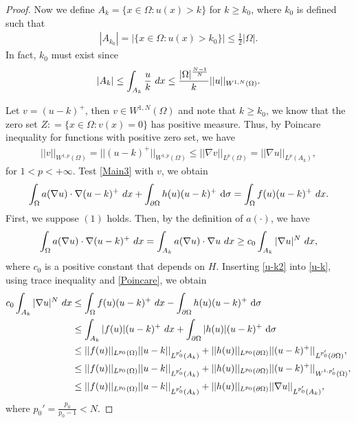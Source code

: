 \documentclass[10pt,a4paper]{amsart}
\numberwithin{equation}{section}
\newcommand{\pa}{\partial}
\newcommand{\dx}{\textup{d}x}
\begin{document}
\begin{proof}
    Now we  define $A_k = \{x \in \Omega: u(x) > k\}$ for $k \geq k_0$, where $k_0$ is defined such that
    \begin{align*}
        |A_{k_0}| = |\{x \in \Omega: u(x) > k_0\}| \leq \frac{1}{2} |\Omega|.
    \end{align*}
    In fact, $k_0$ must exist since
    \begin{align*}
        |A_k| \leq \int_{A_k} \frac{u}{k} \ \dx \leq \frac{|\Omega|^{\frac{N-1}{N}}}{k} ||u||_{W^{1,N}(\Omega)}.
    \end{align*}
    
    Let $v = (u - k)^+$, then $v \in W^{1,N}(\Omega)$ and note that  $k\geq k_0$, we know that the zero set $Z : = \{x \in \Omega: v(x)=0\}$ has positive measure. Thus, by Poincare inequality for functions with positive zero set, we have
    \begin{align}\label{Poincare}
        ||v||_{W^{1,p}(\Omega)} =  ||(u-k)^+||_{W^{1,p}(\Omega)} \leq ||\nabla v||_{L^{p}(\Omega)} = ||\nabla u||_{L^{p}(A_k)},
    \end{align}
    for $1 < p < +\infty$. Test \eqref{Main3} with $v$, we obtain
    \begin{align}\label{u-k}
        \int_{\Omega} a(\nabla u) \cdot \nabla (u-k)^+ \ \dx + \int_{\partial \Omega} h(u) (u-k)^+ \ \text{d}\sigma= \int_{\Omega} f(u) (u-k)^+ \ \dx.
    \end{align}
    First, we suppose $(1)$ holds. %
    Then, by the definition of $a(\cdot)$, we have
    \begin{align}\label{u-k2}
        \int_{\Omega} a(\nabla u) \cdot \nabla (u-k)^+ \ \dx = \int_{A_k} a(\nabla u) \cdot \nabla u  \ \dx \geq c_0 \int_{A_k} |\nabla u|^N \ \dx,
    \end{align}
    where $c_0$ is a positive constant that depends on $H$. Inserting  \eqref{u-k2} into \eqref{u-k}, using trace inequality and \eqref{Poincare}, we obtain
    \begin{align}\label{u-k3}
        c_0 \int_{A_k} |\nabla u|^N \ \dx & \leq \int_{\Omega} f(u) (u-k)^+ \ \dx - \int_{\pa \Omega}h(u)(u-k)^+ \ \text{d} \sigma \nonumber\\
        & \leq  \int_{A_k} |f(u)| (u-k)^+ \ \dx +  \int_{\pa \Omega} |h(u)|(u-k)^+ \ \text{d} \sigma \\
        & \leq ||f(u)||_{L^{p_0}(\Omega)} ||u-k||_{L^{p_0'}(A_k)} + ||h(u)||_{L^{p_0}(\pa \Omega)} ||(u-k)^+||_{L^{p_0'}(\pa \Omega)}, \nonumber \\
        & \leq ||f(u)||_{L^{p_0}(\Omega)} ||u-k||_{L^{p_0'}(A_k)} + ||h(u)||_{L^{p_0}(\pa \Omega)} ||(u-k)^+||_{W^{1,p_0'}(\Omega)}, \nonumber \\
        & \leq ||f(u)||_{L^{p_0}(\Omega)} ||u-k||_{L^{p_0'}(A_k)} + ||h(u)||_{L^{p_0}(\pa \Omega)} ||\nabla u||_{L^{p_0'}(A_k)}, \nonumber
    \end{align}
    where $p_0' = \frac{p_0}{p_0-1}< N$. 
    

\end{proof}
\end{document}
